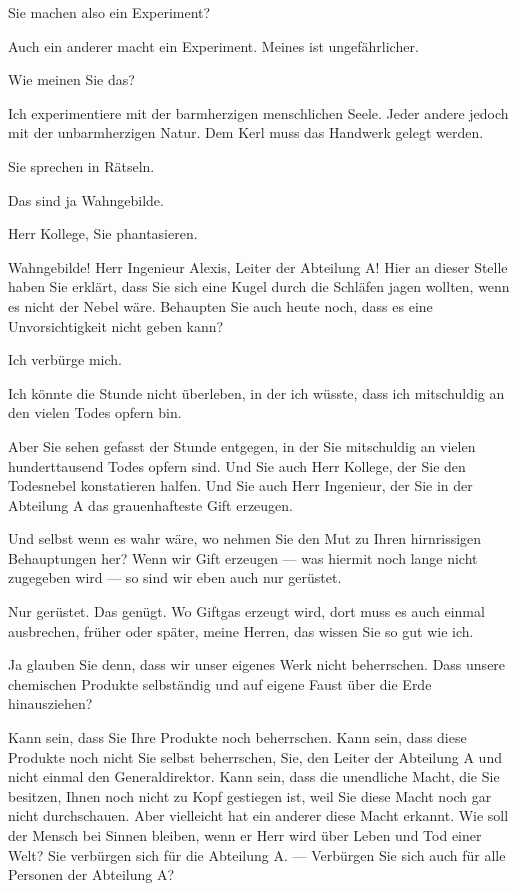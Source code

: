 \documentclass[
	final,
	a4paper,
	ngerman,
	mpinclude = true, %
	twoside = true,
	open = right,
	cleardoublepage = plain,
	DIV = 13,
	BCOR = 1cm,
	titlepage = firstiscover,
	]{scrbook}
\newcommand{\thecharacter}[1]{\textup{\textsc{#1}}\xspace}
\newcommand{\theAlexis}{\thecharacter{Alexis}}
\newcommand{\theThomsen}{\thecharacter{Thomsen}}
\newcommand{\theJonas}{\thecharacter{Jonas}}
\newcommand{\character}[1]{\item[#1]}
\newcommand{\Generaldirektor}{\character{Direktor}}
\newcommand{\Alexis}{\character{\theAlexis}}
\newcommand{\Thomsen}{\character{\theThomsen}}
\newcommand{\Jonas}{\character{\theJonas}}
\begin{document}
\begin{play}
\Alexis
Sie machen also ein Experiment?

\Jonas
Auch ein anderer macht ein Experiment. Meines ist ungefährlicher.

\Generaldirektor
Wie meinen Sie das?

\Jonas
Ich experimentiere mit der barmherzigen menschlichen Seele. Jeder andere jedoch mit der unbarmherzigen Natur. Dem Kerl muss das Handwerk gelegt werden.

\Generaldirektor
Sie sprechen in Rätseln.

\Alexis
Das sind ja Wahngebilde.

\Thomsen
Herr Kollege, Sie phantasieren.

\Jonas
Wahngebilde! Herr Ingenieur Alexis, Leiter der Abteilung A! Hier an dieser Stelle haben Sie erklärt, dass Sie sich eine Kugel durch die Schläfen jagen wollten, wenn es nicht der Nebel wäre. Behaupten Sie auch heute noch, dass es eine Unvorsichtigkeit nicht geben kann?

\Alexis
Ich verbürge mich.

\Generaldirektor
Ich könnte die Stunde nicht überleben, in der ich wüsste, dass ich mitschuldig an den vielen Todes opfern bin.

\Jonas
Aber Sie sehen gefasst der Stunde entgegen, in der Sie mitschuldig an vielen hunderttausend Todes opfern sind. Und Sie auch Herr Kollege, der Sie den Todesnebel konstatieren halfen. Und Sie auch Herr Ingenieur, der Sie in der Abteilung A das grauenhafteste Gift erzeugen.

\Alexis
Und selbst wenn es wahr wäre, wo nehmen Sie den Mut zu Ihren hirnrissigen Behauptungen her? Wenn wir Gift erzeugen --- was hiermit noch lange nicht zugegeben wird --- so sind wir eben auch nur gerüstet.

\Jonas
Nur gerüstet. Das genügt. Wo Giftgas erzeugt wird, dort muss es auch einmal ausbrechen, früher oder später, meine Herren, das wissen Sie so gut wie ich.

\Alexis
Ja glauben Sie denn, dass wir unser eigenes Werk nicht beherrschen. Dass unsere chemischen Produkte selbständig und auf eigene Faust über die Erde hinausziehen?

\Jonas
Kann sein, dass Sie Ihre Produkte noch beherrschen. Kann sein, dass diese Produkte noch nicht Sie selbst beherrschen, Sie, den Leiter der Abteilung A und nicht einmal den Generaldirektor. Kann sein, dass die unendliche Macht, die Sie besitzen, Ihnen noch nicht zu Kopf gestiegen ist, weil Sie diese Macht noch gar nicht durchschauen. Aber vielleicht hat ein anderer diese Macht erkannt. Wie soll der Mensch bei Sinnen bleiben, wenn er Herr wird über Leben und Tod einer Welt? Sie verbürgen sich für die Abteilung A. --- Verbürgen Sie sich auch für alle Personen der Abteilung A?


\end{play}
\end{document}
